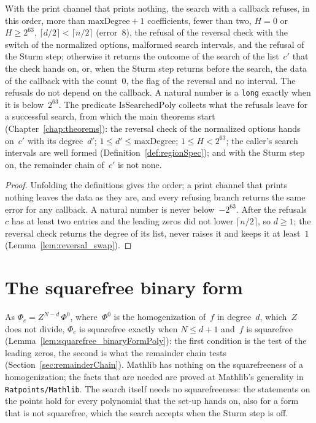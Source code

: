\begin{lemma}\label{lem:setupOrder}
  \leanok
  With the print channel that prints nothing, the search with a callback refuses, in this order,
  more than $\mathrm{maxDegree} + 1$ coefficients, fewer than two, $H = 0$ or $H \ge 2^{63}$,
  $\lceil d/2 \rceil < \lceil n/2 \rceil$ (error~8), the refusal of the reversal check with the
  switch of the normalized options, malformed search intervals, and the refusal of the Sturm step;
  otherwise it returns the outcome of the search of the list~$c'$ that the check hands on, or, when
  the Sturm step returns before the search, the data of the callback with the count~$0$, the flag of
  the reversal and no interval. The refusals do not depend on the callback. A natural number is a
  \verb|long| exactly when it is below~$2^{63}$. The predicate $\mathrm{IsSearchedPoly}$ collects
  what the refusals leave for a successful search, from which the main theorems start
  (Chapter~\ref{chap:theorems}): the reversal check of the normalized options hands on~$c'$ with its
  degree~$d'$; $1 \le d' \le \mathrm{maxDegree}$; $1 \le H < 2^{63}$; the caller's search
  intervals are well formed (Definition~\ref{def:regionSpec}); and with the Sturm step on, the
  remainder chain of~$c'$ is not none.
\end{lemma}

\begin{proof}
  \leanok
  Unfolding the definitions gives the order; a print channel that prints nothing leaves the data as
  they are, and every refusing branch returns the same error for any callback. A natural number is
  never below~$-2^{63}$. After the refusals~$c$ has at least two entries and the leading zeros did
  not lower $\lceil n/2 \rceil$, so $d \ge 1$; the reversal check returns the degree of its list,
  never raises it and keeps it at least~$1$ (Lemma~\ref{lem:reversal_swap}).
\end{proof}

\section{The squarefree binary form}\label{sec:setupSquarefree}

As $\Phi_c = Z^{N-d}\,\Phi^0$, where~$\Phi^0$ is the homogenization of~$f$ in degree~$d$, which~$Z$
does not divide, $\Phi_c$ is squarefree exactly when $N \le d + 1$ and~$f$ is squarefree
(Lemma~\ref{lem:squarefree_binaryFormPoly}): the first condition is the test of the leading zeros,
the second is what the remainder chain tests (Section~\ref{sec:remainderChain}). Mathlib has nothing
on the squarefreeness of a homogenization; the facts that are needed are proved at Mathlib's
generality in \verb|Ratpoints/Mathlib|. The search itself needs no squarefreeness: the statements on
the points hold for every polynomial that the set-up hands on, also for a form that is not
squarefree, which the search accepts when the Sturm step is off.

